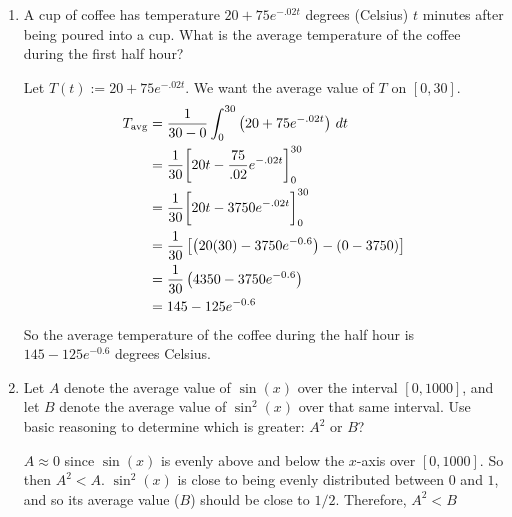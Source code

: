 \documentclass[handout,nooutcomes]{ximera}
\begin{document}
\begin{problem}
	\begin{enumerate}
	
	\item  A cup of coffee has temperature $20 + 75e^{-.02t}$ degrees (Celsius) $t$ minutes after being poured into a cup.  
	What is the average temperature of the coffee during the first half hour?
		\begin{freeResponse}
		Let $T(t) := 20 + 75e^{-.02t}$.  We want the average value of $T$ on $[0,30]$.
			\begin{align*}
			T_{\text{avg}} &= \frac{1}{30-0} \int_0^{30} \left( 20 + 75e^{-.02t} \right) \,d t  \\
			&= \frac{1}{30} \bigg[ 20t - \frac{75}{.02} e^{-.02t} \bigg]_0^{30}  \\
			&= \frac{1}{30} \bigg[ 20t - 3750 e^{-.02t} \bigg]_0^{30}  \\
			&= \frac{1}{30} \left[ \left( 20(30) - 3750e^{-0.6} \right) - (0 - 3750) \right]  \\
			&= \frac{1}{30} \left( 4350 - 3750e^{-0.6} \right)  \\
			&= 145 - 125e^{-0.6} 
			\end{align*}
		So the average temperature of the coffee during the half hour is $145 - 125e^{-0.6}$ degrees Celsius.
		\end{freeResponse}
		
		
		
	\item  Let $A$ denote the average value of $\sin(x)$ over the interval $[0,1000]$, 
	and let $B$ denote the average value of $\sin^2(x)$ over that same interval.  
	Use basic reasoning to determine which is greater:  $A^2$ or $B$?  
		\begin{freeResponse}
		$A \approx 0$ since $\sin(x)$ is evenly above and below the $x$-axis over $[0,1000]$.  
		So then $A^2 < A$.  
		$\sin^2(x)$ is close to being evenly distributed between $0$ and $1$, and so its average value ($B$) should be close to $1/2$.  
		Therefore, $A^2 < B$
		\end{freeResponse}
		
		
		
	\end{enumerate}
		
		
		

\end{problem}
	
	
	
	
	
\end{document}
